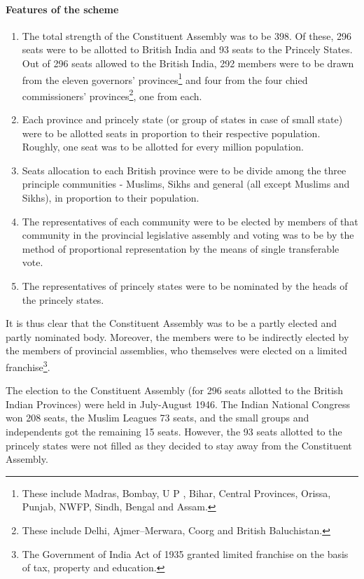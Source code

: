 \paragraph{Features of the scheme}
\begin{enumerate}
  \item The total strength of the Constituent Assembly was to be 398. Of these, 296 seats were to be allotted to British India and 93 seats to the Princely States. Out of 296 seats allowed to the British India, 292 members were to be drawn from the eleven governors' provinces\footnote{These include Madras, Bombay, U P , Bihar, Central Provinces, Orissa, Punjab, NWFP, Sindh, Bengal and Assam.} and four from the four chied commissioners' provinces\footnote{These include Delhi, Ajmer–Merwara, Coorg and British Baluchistan.}, one from each.
  \item Each province and princely state (or group of states in case of small state) were to be allotted seats in proportion to their respective population. Roughly, one seat was to be allotted for every million population.
  \item Seats allocation to each British province were to be divide among the three principle communities - Muslims, Sikhs and general (all except Muslims and Sikhs), in proportion to their population.
  \item The representatives of each community were to be elected by members of that community in the provincial legislative assembly and voting was to be by the method of proportional representation by the means of single transferable vote.
  \item The representatives of princely states were to be nominated by the heads of the princely states.
\end{enumerate}

It is thus clear that the Constituent Assembly was to be a partly elected and partly nominated body. Moreover, the members were to be indirectly elected by the members of provincial assemblies, who themselves were elected on a limited franchise\footnote{The Government of India Act of 1935 granted limited franchise on the basis of tax, property and education.}.

The election to the Constituent Assembly (for 296 seats allotted to the British Indian Provinces) were held in July-August 1946. The Indian National Congress won 208 seats, the Muslim Leagues 73 seats, and the small groups and independents got the remaining 15 seats. However, the 93 seats allotted to the princely states were not filled as they decided to stay away from the Constituent Assembly.

